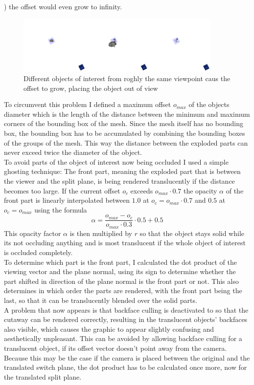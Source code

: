 ) the offset would even grow to infinity.\\
\begin{figure}[tb]
	\centering
	\includegraphics[width=0.9\textwidth]{chapters/figures/infinity}
	\caption{Different objects of interest from roghly the same viewpoint caus the offset to grow, placing the object out of view}
	\label{fig:infinity}
\end{figure}
To circumvent this problem I defined a maximum offset $o_{max}$ of the objects diameter which is the length of the distance between the minimum and maximum corners of the bounding box of the mesh. Since the mesh itself has no bounding box, the bounding box has to be accumulated by combining the bounding boxes of the groups of the mesh. This way the distance between the exploded parts can never exceed twice the diameter of the object.\\
To avoid parts of the object of interest now being occluded I used a simple ghosting technique: 
The front part, meaning the exploded part that is between the viewer and the split plane, is being rendered translucently if the distance becomes too large.
If the current offset $o_c$ exceeds $o_{max} \cdot 0.7$ the opacity $\alpha$ of the front part is linearly interpolated between $1.0$ at $o_c = o_{max} \cdot 0.7$ and $0.5$ at  $o_c = o_{max}$ using the formula
\begin{equation}
	\alpha = \frac{o_{max}-o_c}{o_{max} \cdot 0.3} \cdot 0.5 + 0.5
\end{equation}
This opacity factor $\alpha$ is then multiplied by $r$ so that the object stays solid while its not occluding anything and is most translucent if the whole object of interest is occluded completely.\\
To determine which part is the front part, I calculated the dot product of the viewing vector and the plane normal, using its sign to determine whether the part shifted in direction of the plane normal is the front part or not. This also determines in which order the parts are rendered, with the front part being the last, so that it can be translucently blended over the solid parts.\\
A problem that now appears is that backface culling is deactivated to so that the cutaway can be rendered correctly, resulting in the translucent objects' backfaces also visible, which causes the graphic to appear slightly confusing and aesthetically unpleasant. This can be avoided by allowing backface culling for a translucent object, if its offset vector doesn't point away from the camera. Because this may be the case if the camera is placed between the original and the translated switch plane, the dot product has to be calculated once more, now for the translated split plane.\\
